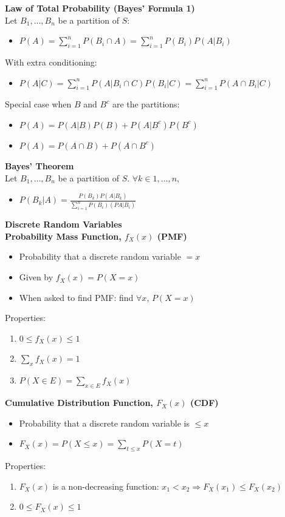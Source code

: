 \documentclass[a4paper, 12pt]{article}
\begin{document}
\begin{multicols*}{3}
\begin{itemize}
\end{itemize}
\textbf{Law of Total Probability (Bayes' Formula 1)} \\
Let $B_1, ..., B_n$ be a partition of $S$:
\begin{itemize}
    \item $P(A) = \sum_{i=1}^n P(B_i \cap A) = \sum_{i=1}^n P(B_i)P(A|B_i)$
\end{itemize}
With extra conditioning:
\begin{itemize}
    \item $P(A|C) = \sum_{i=1}^n P(A|B_i \cap C)P(B_i|C) = \sum_{i=1}^n P(A \cap B_i|C)$
\end{itemize}
Special case when $B$ and $B^c$ are the partitions:
\begin{itemize}
    \item $P(A) = P(A|B)P(B) + P(A|B^c)P(B^c)$
    \item $P(A) = P(A \cap B) + P(A \cap B^c)$
\end{itemize}
\textbf{Bayes' Theorem} \\
Let $B_1, \ldots , B_n$ be a partition of $S$. $\forall k \in 1, \ldots , n$,
\begin{itemize}
    \item $P(B_k|A) = \frac{P(B_k)P(A|B_k)}{\sum_{i=1}^n P(B_i)(PA|B_i)}$
\end{itemize}

\medskip

{\small\textbf{Discrete Random Variables}} \\
\textbf{Probability Mass Function, $f_X(x)$ (PMF)}
\begin{itemize}
    \item Probability that a discrete random variable $= x$
    \item Given by $f_X(x) = P(X = x)$
    \item When asked to find PMF: find $\forall x$, $P(X = x)$ 
\end{itemize}
\vfill\null
\columnbreak
Properties:
\begin{enumerate}
    \item $0 \leq f_X(x) \leq 1$
    \item $\sum_{x} f_X(x) = 1$
    \item $P(X \in E) = \sum_{x \in E} f_X(x)$
\end{enumerate}
\textbf{Cumulative Distribution Function, $F_X(x)$ (CDF)}
\begin{itemize}
    \item Probability that a discrete random variable is $\leq x$
    \item $F_X(x) = P(X \leq x) = \sum_{t \leq x} P(X = t)$
\end{itemize}
Properties:
\begin{enumerate}
    \item $F_X(x)$ is a non-decreasing function: $x_1 < x_2 \Rightarrow F_X(x_1) \leq F_X(x_2)$
    \item $0 \leq F_X(x) \leq 1$
\end{enumerate}


\end{multicols*}
\end{document}
